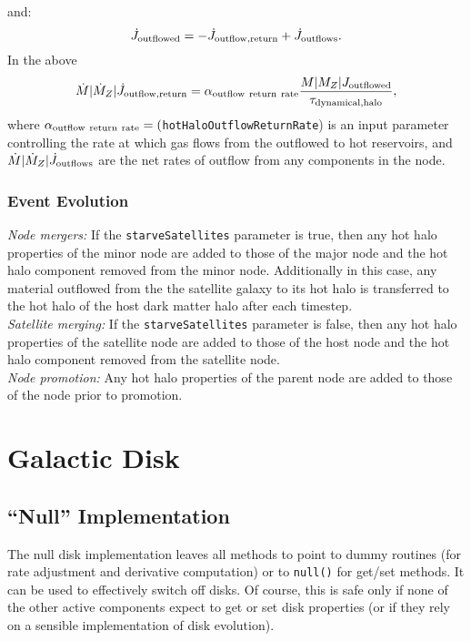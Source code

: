 and:
\begin{equation}
 \dot{J}_{\rm outflowed} = - \dot{J}_{\rm outflow,return} + \dot{J}_{\rm outflows}.
\end{equation}
In the above
\begin{equation}
 \dot{M}|\dot{M}_Z|\dot{J}_{\rm outflow,return} = \alpha_{\rm outflow~return~rate} {M|M_Z|J_{\rm outflowed}\over \tau_{\rm dynamical, halo}},
\end{equation}
where $\alpha_{\rm outflow~return~rate}=(${\tt hotHaloOutflowReturnRate}) is an input parameter controlling the rate at which gas flows from the outflowed to hot reservoirs, and $\dot{M}|\dot{M}_Z|\dot{J}_{\rm outflows}$ are the net rates of outflow from any components in the node.

\subsubsection{Event Evolution}

\noindent\emph{Node mergers:} If the {\tt starveSatellites} parameter is true, then any hot halo properties of the minor node are added to those of the major node and the hot halo component removed from the minor node. Additionally in this case, any material outflowed from the the satellite galaxy to its hot halo is transferred to the hot halo of the host dark matter halo after each timestep.\\

\noindent\emph{Satellite merging:} If the {\tt starveSatellites} parameter is false, then any hot halo properties of the satellite node are added to those of the host node and the hot halo component removed from the satellite node.\\

\noindent\emph{Node promotion:} Any hot halo properties of the parent node are added to those of the node prior to promotion.\\

\section{Galactic Disk}

\subsection{``Null'' Implementation}

The null disk implementation leaves all methods to point to dummy routines (for rate adjustment and derivative computation) or to {\tt null()} for get/set methods. It can be used to effectively switch off disks. Of course, this is safe only if none of the other active components expect to get or set disk properties (or if they rely on a sensible implementation of disk evolution).

